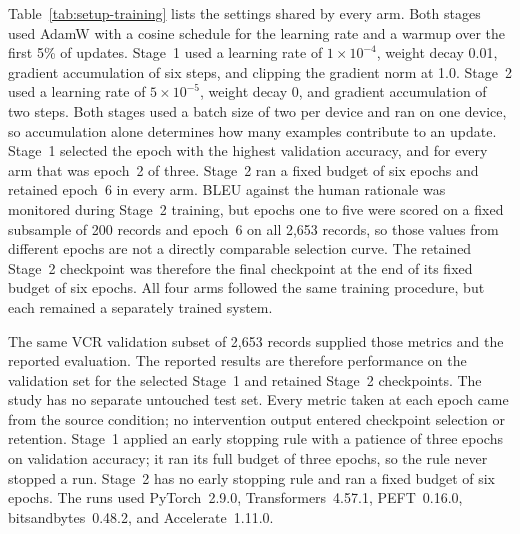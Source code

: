 Table~\ref{tab:setup-training} lists the settings shared by every arm. Both
stages used AdamW with a cosine schedule for the learning rate and a warmup over
the first 5\% of updates. Stage~1 used a learning rate of $1\times10^{-4}$, weight
decay 0.01, gradient accumulation of six steps, and clipping the gradient norm at
1.0. Stage~2 used a learning rate of $5\times10^{-5}$, weight decay 0, and
gradient accumulation of two steps. Both stages used a batch size of two per
device and ran on one device, so accumulation alone determines how many examples
contribute to an update. Stage~1 selected the epoch with the highest validation
accuracy, and for every arm that was epoch~2 of three. Stage~2 ran a fixed budget
of six epochs and retained epoch~6 in every arm. BLEU against the human rationale
was monitored during Stage~2 training, but epochs one to five were scored on a
fixed subsample of 200 records and epoch~6 on all 2,653 records, so those values
from different epochs are not a directly comparable selection curve. The retained
Stage~2 checkpoint was therefore the final checkpoint at the end of its fixed
budget of six epochs. All four arms followed the same training procedure, but
each remained a separately trained system.

The same VCR validation subset of 2,653 records supplied those metrics and the
reported evaluation. The reported results are therefore performance on the
validation set for the selected Stage~1 and retained Stage~2
checkpoints. The study has no separate untouched test set. Every metric taken
at each epoch came from the source condition; no intervention output entered
checkpoint selection or retention. Stage~1 applied an early stopping rule with a
patience of three epochs on validation accuracy; it ran its full budget of three
epochs, so the rule never stopped a run. Stage~2 has no early stopping rule and
ran a fixed budget of six epochs. The runs used
PyTorch~2.9.0, Transformers~4.57.1, PEFT~0.16.0, bitsandbytes~0.48.2, and
Accelerate~1.11.0.

